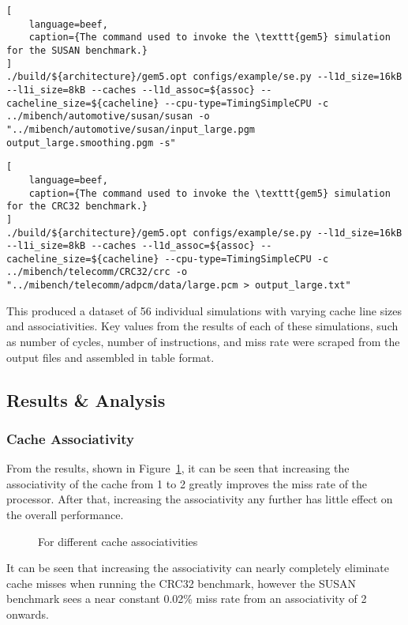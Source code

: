 \begin{lstlisting}[
    language=beef,
    caption={The command used to invoke the \texttt{gem5} simulation for the SUSAN benchmark.}
]
./build/${architecture}/gem5.opt configs/example/se.py --l1d_size=16kB --l1i_size=8kB --caches --l1d_assoc=${assoc} --cacheline_size=${cacheline} --cpu-type=TimingSimpleCPU -c ../mibench/automotive/susan/susan -o "../mibench/automotive/susan/input_large.pgm output_large.smoothing.pgm -s"
\end{lstlisting}

\begin{lstlisting}[
    language=beef,
    caption={The command used to invoke the \texttt{gem5} simulation for the CRC32 benchmark.}
]
./build/${architecture}/gem5.opt configs/example/se.py --l1d_size=16kB --l1i_size=8kB --caches --l1d_assoc=${assoc} --cacheline_size=${cacheline} --cpu-type=TimingSimpleCPU -c ../mibench/telecomm/CRC32/crc -o "../mibench/telecomm/adpcm/data/large.pcm > output_large.txt"
\end{lstlisting}

This produced a dataset of 56 individual simulations with varying cache line sizes and
associativities.
Key values from the results of each of these simulations, such as number of cycles,
number of instructions, and miss rate were scraped from the output files and assembled 
in table format.

\subsection{Results \& Analysis}

\subsubsection{Cache Associativity}

From the results, shown in Figure~\ref{fig:partb-assoc},
it can be seen that increasing the associativity of the cache from 
1 to 2 greatly improves the miss rate of the processor. After that, increasing the 
associativity any further has little effect on the overall performance.

\begin{figure}[H]
    \centering
    
    \caption{For different cache associativities}
    \label{fig:partb-assoc}
\end{figure}%

It can be seen that increasing the associativity can nearly completely eliminate
cache misses when running the CRC32 benchmark, however the SUSAN benchmark sees a near
constant 0.02\% miss rate from an associativity of 2 onwards.

